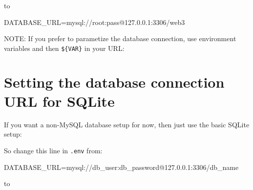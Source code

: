 \documentclass[a4paperpaper,openright]{book}
\newenvironment{Shaded}{}{}
\newcommand{\ExtensionTok}[1]{#1}
\newcommand{\NormalTok}[1]{#1}
\newcommand{\VariableTok}[1]{\textcolor[rgb]{0.10,0.09,0.49}{#1}}
\begin{document}
to

\begin{Shaded}
\begin{Highlighting}[]
    \VariableTok{DATABASE_URL=}\NormalTok{mysql://root:pass}\ExtensionTok{@127.0.0.1}\NormalTok{:3306/web3}
\end{Highlighting}
\end{Shaded}

NOTE: If you prefer to parametize the database connection, use
environment variables and then \texttt{\$\{VAR\}} in your URL:

\begin{Shaded}
\end{Shaded}

\hypertarget{setting-the-database-connection-url-for-sqlite}{%
\section{Setting the database connection URL for
SQLite}\label{setting-the-database-connection-url-for-sqlite}}

If you want a non-MySQL database setup for now, then just use the basic
SQLite setup:

So change this line in \texttt{.env} from:

\begin{Shaded}
\begin{Highlighting}[]
    \VariableTok{DATABASE_URL=}\NormalTok{mysql://db_user:db_password}\ExtensionTok{@127.0.0.1}\NormalTok{:3306/db_name}
\end{Highlighting}
\end{Shaded}

to

\begin{Shaded}
\end{Shaded}
\end{document}
